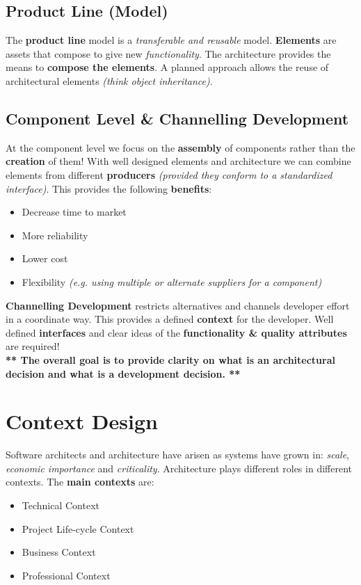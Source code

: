 \documentclass[a4paper]{report}
\begin{document}
\section{Product Line (Model)}
The \textbf{product line} model is a \textit{transferable and reusable} model. \textbf{Elements} are assets that compose to give new \textit{functionality}. The architecture provides the means to \textbf{compose the elements}. A planned approach allows the reuse of architectural elements \textit{(think object inheritance)}.

\section{Component Level \& Channelling Development}
At the component level we focus on the \textbf{assembly} of components rather than the \textbf{creation} of them! With well designed elements and architecture we can combine elements from different \textbf{producers} \textit{(provided they conform to a standardized interface)}. This provides the following \textbf{benefits}:
\begin{itemize}
\item Decrease time to market
\item More reliability
\item Lower cost
\item Flexibility \textit{(e.g. using multiple or alternate suppliers for a component)}\\
\end{itemize}

\textbf{Channelling Development} restricts alternatives and channels developer effort in a coordinate way. This provides a defined \textbf{context} for the developer. Well defined \textbf{interfaces} and clear ideas of the \textbf{functionality \& quality attributes} are required!\\

\textbf{** The overall goal is to provide clarity on what is an architectural decision and what is a development decision. **}
\newpage


\chapter{Context Design}
Software architects and architecture have arisen as systems have grown in: \textit{scale}, \textit{economic importance} and \textit{criticality}. Architecture plays different roles in different contexts. The \textbf{main contexts} are:
\begin{itemize}
\item Technical Context
\item Project Life-cycle Context
\item Business Context
\item Professional Context
\end{itemize}
\end{document}
